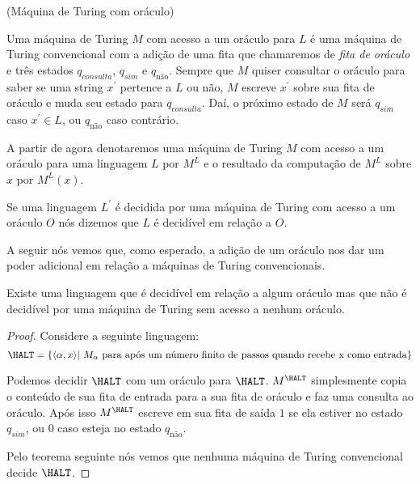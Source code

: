 \begin{defi} (Máquina de Turing com oráculo)

Uma máquina de Turing $M$ com acesso a um oráculo para $L$ é uma máquina de Turing convencional com a adição de uma fita que chamaremos de \emph{fita de oráculo} e três estados $q_{consulta}$, $q_{sim}$ e $q_{\text{não}}$. Sempre que $M$ quiser consultar o oráculo para saber se uma string $x^{\prime}$ pertence a $L$ ou não, $M$ escreve $x^{\prime}$ sobre  sua fita de oráculo e muda seu estado para $q_{consulta}$. Daí, o próximo estado de $M$ será $q_{sim}$ caso $x^{\prime} \in L$, ou $q_{\text{não}}$ caso contrário.

A partir de agora denotaremos uma máquina de Turing $M$ com acesso a um oráculo para uma linguagem $L$ por $M^{L}$ e o resultado da computação de $M^{L}$ sobre $x$ por $M^{L}(x)$.

\end{defi}

Se uma linguagem $L^{\prime}$ é decidida por uma máquina de Turing com acesso a um oráculo $O$ nós dizemos que $L$ é decidível em relação a $O$.

A seguir nós vemos que, como esperado, a adição de um oráculo nos dar um poder adicional em relação a máquinas de Turing convencionais.

\begin{teo}

Existe uma linguagem que é decidível em relação a algum oráculo mas que não é decidível por uma máquina de Turing sem acesso a nenhum oráculo.

\end{teo}

\begin{proof}

Considere a seguinte linguagem:
\begin{equation*}
    \HALT = \{\langle \alpha, x \rangle \vert \text{ $M_{\alpha}$ para após um número finito de passos quando recebe x como entrada} \}
\end{equation*}

Podemos decidir $\HALT$ com um oráculo para $\HALT$. $M^{\HALT}$ simplesmente copia o conteúdo de sua fita de entrada para a sua fita de oráculo e faz uma consulta ao oráculo. Após isso $M^{\HALT}$ escreve em sua fita de saída $1$ se ela estiver no estado $q_{sim}$, ou 0 caso esteja no estado $q_{\text{não}}$.

Pelo teorema seguinte nós vemos que nenhuma máquina de Turing convencional decide $\HALT$.

\end{proof}

